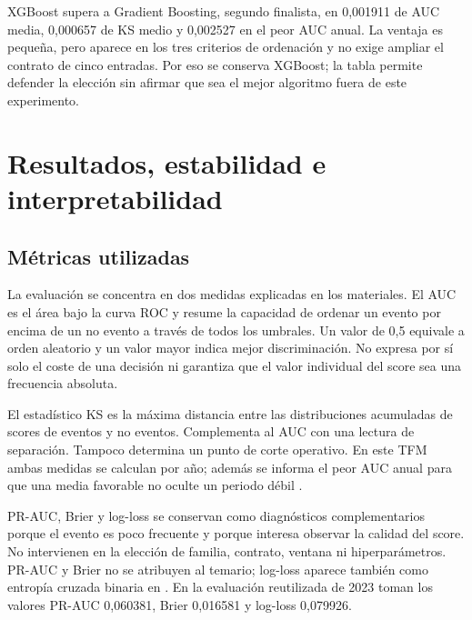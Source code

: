 \documentclass[10pt,a4paper]{article}
\newcommand{\FinalPRAUC}{0,060381}
\newcommand{\FinalBrier}{0,016581}
\newcommand{\FinalLogLoss}{0,079926}
\begin{document}
XGBoost supera a Gradient Boosting, segundo finalista, en 0,001911 de AUC media,
0,000657 de KS medio y 0,002527 en el peor AUC anual. La ventaja es pequeña, pero
aparece en los tres criterios de ordenación y no exige ampliar el contrato de
cinco entradas. Por
eso se conserva XGBoost; la tabla permite defender la elección sin afirmar que
sea el mejor algoritmo fuera de este experimento.

\clearpage
\section{Resultados, estabilidad e interpretabilidad}

\subsection{Métricas utilizadas}

La evaluación se concentra en dos medidas explicadas en los materiales. El AUC
es el área bajo la curva ROC y resume la capacidad de ordenar un evento por
encima de un no evento a través de todos los umbrales. Un valor de 0,5 equivale
a orden aleatorio y un valor mayor indica mejor discriminación. No expresa por
sí solo el coste de una decisión ni garantiza que el valor individual del score
sea una frecuencia absoluta.

El estadístico KS es la máxima distancia entre las distribuciones acumuladas de
scores de eventos y no eventos. Complementa al AUC con una lectura de
separación. Tampoco determina un punto de corte operativo. En este TFM ambas
medidas se calculan por año; además se informa el peor AUC anual para que una
media favorable no oculte un periodo débil \cite{clasificadores,scoring}.

PR-AUC, Brier y log-loss se conservan como diagnósticos complementarios porque
el evento es poco frecuente y porque interesa observar la calidad del score. No
intervienen en la elección de familia, contrato, ventana ni hiperparámetros.
PR-AUC y Brier no se atribuyen al temario; log-loss aparece también como entropía
cruzada binaria en \cite[p.~36]{intro-dl}. En la evaluación reutilizada de 2023
toman los valores PR-AUC \FinalPRAUC{}, Brier \FinalBrier{} y log-loss
\FinalLogLoss{}.
\end{document}
